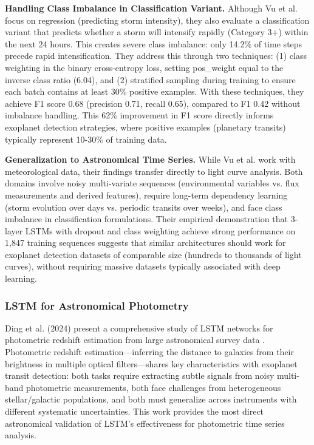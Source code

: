 \documentclass[letterpaper]{article} %
\begin{document}
\textbf{Handling Class Imbalance in Classification Variant.} Although Vu et al. focus on regression (predicting storm intensity), they also evaluate a classification variant that predicts whether a storm will intensify rapidly (Category 3+) within the next 24 hours. This creates severe class imbalance: only 14.2\% of time steps precede rapid intensification. They address this through two techniques: (1) class weighting in the binary cross-entropy loss, setting pos\_weight equal to the inverse class ratio (6.04), and (2) stratified sampling during training to ensure each batch contains at least 30\% positive examples. With these techniques, they achieve F1 score 0.68 (precision 0.71, recall 0.65), compared to F1 0.42 without imbalance handling. This 62\% improvement in F1 score directly informs exoplanet detection strategies, where positive examples (planetary transits) typically represent 10-30\% of training data.

\textbf{Generalization to Astronomical Time Series.} While Vu et al. work with meteorological data, their findings transfer directly to light curve analysis. Both domains involve noisy multi-variate sequences (environmental variables vs. flux measurements and derived features), require long-term dependency learning (storm evolution over days vs. periodic transits over weeks), and face class imbalance in classification formulations. Their empirical demonstration that 3-layer LSTMs with dropout and class weighting achieve strong performance on 1,847 training sequences suggests that similar architectures should work for exoplanet detection datasets of comparable size (hundreds to thousands of light curves), without requiring massive datasets typically associated with deep learning.

\subsubsection{LSTM for Astronomical Photometry}
Ding et al. (2024) present a comprehensive study of LSTM networks for photometric redshift estimation from large astronomical survey data \cite{Ding2024photometric}. Photometric redshift estimation—inferring the distance to galaxies from their brightness in multiple optical filters—shares key characteristics with exoplanet transit detection: both tasks require extracting subtle signals from noisy multi-band photometric measurements, both face challenges from heterogeneous stellar/galactic populations, and both must generalize across instruments with different systematic uncertainties. This work provides the most direct astronomical validation of LSTM's effectiveness for photometric time series analysis.
\end{document}

